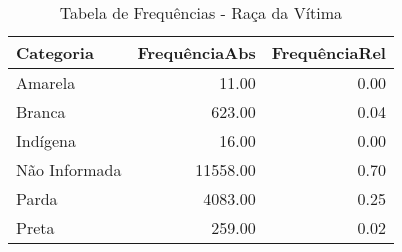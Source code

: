 \begin{table}[ht]
\centering
\begin{tabular}{lrr}
  \hline
Categoria & FrequênciaAbs & FrequênciaRel \\ 
  \hline
Amarela & 11.00 & 0.00 \\ 
  Branca & 623.00 & 0.04 \\ 
  Indígena & 16.00 & 0.00 \\ 
  Não Informada & 11558.00 & 0.70 \\ 
  Parda & 4083.00 & 0.25 \\ 
  Preta & 259.00 & 0.02 \\ 
   \hline
\end{tabular}
\caption{Tabela de Frequências - Raça da Vítima} 
\end{table}
